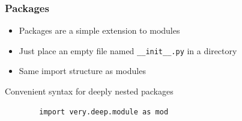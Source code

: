 \documentclass[11pt,professionalfonts]{beamer}
\begin{document}
\begin{frame}[fragile]\frametitle{Packages}
    \begin{itemize}
        \item Packages are a simple extension to modules
        \item Just place an empty file named \texttt{\_\_init\_\_.py} in a directory
        \item Same import structure as modules
    \end{itemize}

    Convenient syntax for deeply nested packages
    \begin{verbatim}
        import very.deep.module as mod
    \end{verbatim}
\end{frame}
\end{document}
